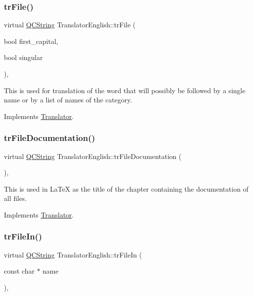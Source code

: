 \subsubsection{\texorpdfstring{trFile()}{trFile()}}
{\footnotesize\ttfamily virtual \mbox{\hyperlink{class_q_c_string}{Q\+C\+String}} Translator\+English\+::tr\+File (\begin{DoxyParamCaption}\item[{bool}]{first\+\_\+capital,  }\item[{bool}]{singular }\end{DoxyParamCaption})\hspace{0.3cm}{\ttfamily [inline]}, {\ttfamily [virtual]}}

This is used for translation of the word that will possibly be followed by a single name or by a list of names of the category. 

Implements \mbox{\hyperlink{class_translator}{Translator}}.

\mbox{\label{class_translator_english_a7d5dbf4902fdbd4edcdbe27812e9d52d}} 
\subsubsection{\texorpdfstring{trFileDocumentation()}{trFileDocumentation()}}
{\footnotesize\ttfamily virtual \mbox{\hyperlink{class_q_c_string}{Q\+C\+String}} Translator\+English\+::tr\+File\+Documentation (\begin{DoxyParamCaption}{ }\end{DoxyParamCaption})\hspace{0.3cm}{\ttfamily [inline]}, {\ttfamily [virtual]}}

This is used in La\+TeX as the title of the chapter containing the documentation of all files. 

Implements \mbox{\hyperlink{class_translator}{Translator}}.

\mbox{\label{class_translator_english_a1e4e9602b9331c2761e7a3e8682291d0}} 
\subsubsection{\texorpdfstring{trFileIn()}{trFileIn()}}
{\footnotesize\ttfamily virtual \mbox{\hyperlink{class_q_c_string}{Q\+C\+String}} Translator\+English\+::tr\+File\+In (\begin{DoxyParamCaption}\item[{const char $\ast$}]{name }\end{DoxyParamCaption})\hspace{0.3cm}{\ttfamily [inline]}, {\ttfamily [virtual]}}

